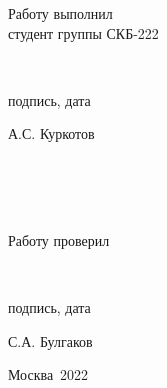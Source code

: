 \documentclass[a4paper, 12pt]{article}
\begin{document}
\begin{titlepage}
\begin{flushright}
\begin{minipage}[center]{15cm}
    \begin{minipage}[left]{5cm}
      {Работу выполнил\\студент группы СКБ-222}
    \end{minipage}
    \begin{minipage}[center]{5cm}
      \vspace{1.25cm}
      \hrulefill\\[-1cm]
      \begin{center}{подпись, дата}\end{center}
    \end{minipage}
    \begin{minipage}[right]{4cm}
      \vspace{0.4cm}
      \begin{flushright}{А.С. Куркотов}\end{flushright}
    \end{minipage}
    \\
    \\
    \\
    \begin{minipage}[left]{5cm}
      {Работу проверил}
    \end{minipage}
    \begin{minipage}[center]{5cm}
      \vspace{1.25cm}
      \hrulefill\\[-1cm]
      \begin{center}{подпись, дата}\end{center}
    \end{minipage}
    \begin{minipage}[right]{4cm}
      \begin{flushright}{С.А. Булгаков}\end{flushright}
    \end{minipage}
  \end{minipage}
\end{flushright}

\vspace{\fill}

\begin{center}
Москва~2022
\end{center}
\end{titlepage}
\setcounter{page}{2}
\setcounter{secnumdepth}{5}
\setcounter{tocdepth}{5}

\tableofcontents
\cleardoublepage

\setcounter{section}{1}
\graphicspath{ {./images/} }
\end{document}
